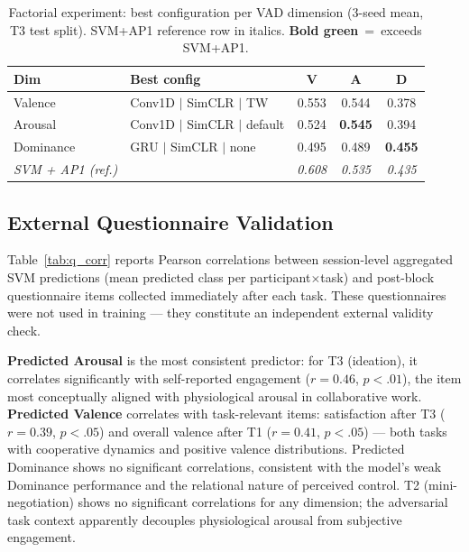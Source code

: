 \documentclass[sigconf,review,anonymous]{acmart}
\newcommand{\best}[1]{\textbf{\textcolor{bestcol}{#1}}}
\begin{document}
\begin{table}[t]
\caption{Factorial experiment: best configuration per VAD dimension
(3-seed mean, T3 test split). SVM+AP1 reference row in italics.
\best{Bold green}~=~exceeds SVM+AP1.}
\label{tab:factorial_best}
\centering
\setlength{\tabcolsep}{4pt}
\small
\begin{tabular}{llccc}
\toprule
\textbf{Dim} & \textbf{Best config} & \textbf{V} & \textbf{A} & \textbf{D} \\
\midrule
Valence   & Conv1D $|$ SimCLR $|$ TW      & 0.553 & 0.544 & 0.378 \\
Arousal   & Conv1D $|$ SimCLR $|$ default & 0.524 & \best{0.545} & 0.394 \\
Dominance & GRU $|$ SimCLR $|$ none       & 0.495 & 0.489 & \best{0.455} \\
\midrule
\textit{SVM + AP1 (ref.)}
  & & \textit{0.608} & \textit{0.535} & \textit{0.435} \\
\bottomrule
\end{tabular}
\end{table}

\subsection{External Questionnaire Validation}
\label{sec:q_validation}

Table~\ref{tab:q_corr} reports Pearson correlations between session-level
aggregated SVM predictions (mean predicted class per participant$\times$task)
and post-block questionnaire items collected immediately after each task.
These questionnaires were not used in training --- they constitute an
independent external validity check.

\textbf{Predicted Arousal} is the most consistent predictor:
for T3 (ideation), it correlates significantly with self-reported engagement
($r{=}0.46$, $p{<}.01$), the item most conceptually aligned with physiological
arousal in collaborative work.
\textbf{Predicted Valence} correlates with task-relevant items: satisfaction
after T3 ($r{=}0.39$, $p{<}.05$) and overall valence after T1
($r{=}0.41$, $p{<}.05$) --- both tasks with cooperative dynamics and
positive valence distributions.
Predicted Dominance shows no significant correlations, consistent with the
model's weak Dominance performance and the relational nature of perceived control.
T2 (mini-negotiation) shows no significant correlations for any dimension;
the adversarial task context apparently decouples physiological arousal from
subjective engagement.
\end{document}
